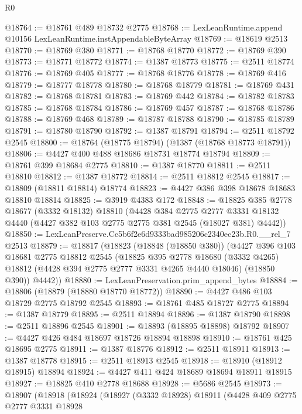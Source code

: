 \begin{lexlean}{R0}
\begin{coremodule}
@18764 := @18761 @489 @18732 @2775
@18768 := LexLeanRuntime.append @10156 LexLeanRuntime.instAppendableByteArray
@18769 := @18619 @2513
@18770 := @18769 @380
@18771 := @18768 @18770
@18772 := @18769 @390
@18773 := @18771 @18772
@18774 := @1387 @18773
@18775 := @2511 @18774
@18776 := @18769 @405
@18777 := @18768 @18776
@18778 := @18769 @416
@18779 := @18777 @18778
@18780 := @18768 @18779
@18781 := @18769 @431
@18782 := @18768 @18781
@18783 := @18769 @442
@18784 := @18782 @18783
@18785 := @18768 @18784
@18786 := @18769 @457
@18787 := @18768 @18786
@18788 := @18769 @468
@18789 := @18787 @18788
@18790 := @18785 @18789
@18791 := @18780 @18790
@18792 := @1387 @18791
@18794 := @2511 @18792 @2545
@18800 := @18764 (@18775 @18794) (@1387 (@18768 @18773 @18791))
@18806 := @4427 @400 @488 @18686 @18731 @18774 @18794
@18809 := @18761 @399 @18684 @2775
@18810 := @1387 @18770
@18811 := @2511 @18810
@18812 := @1387 @18772
@18814 := @2511 @18812 @2545
@18817 := @18809 (@18811 @18814) @18774
@18823 := @4427 @386 @398 @18678 @18683 @18810 @18814
@18825 := @3919 @4383 @172
@18848 := @18825
    @385
    @2778
    @18677
    (@3332 @18132)
    @18810
    (@4428
      @384
      @2775
      @2777
      @3331
      @18132
      @4440
      (@4427 @382 @103 @2775 @2775 @381 @2545 (@18027 @381) @4442))
@18850 := LexLeanPreserve.Cc5b6f2e6d9333bad985206c2340ec23b.R0.__rel_7 @2513
@18879 := @18817
    (@18823
      (@18848 (@18850 @380))
      (@4427
        @396
        @103
        @18681
        @2775
        @18812
        @2545
        (@18825
          @395
          @2778
          @18680
          (@3332 @4265)
          @18812
          (@4428 @394 @2775 @2777 @3331 @4265 @4440 @18046)
          (@18850 @390))
        @4442))
@18880 := LexLeanPreservation.prim_append_bytes
@18884 := @18806 (@18879 (@18880 @18770 @18772))
@18890 := @4427 @486 @103 @18729 @2775 @18792 @2545
@18893 := @18761 @485 @18727 @2775
@18894 := @1387 @18779
@18895 := @2511 @18894
@18896 := @1387 @18790
@18898 := @2511 @18896 @2545
@18901 := @18893 (@18895 @18898) @18792
@18907 := @4427 @426 @484 @18697 @18726 @18894 @18898
@18910 := @18761 @425 @18695 @2775
@18911 := @1387 @18776
@18912 := @2511 @18911
@18913 := @1387 @18778
@18915 := @2511 @18913 @2545
@18918 := @18910 (@18912 @18915) @18894
@18924 := @4427 @411 @424 @18689 @18694 @18911 @18915
@18927 := @18825 @410 @2778 @18688
@18928 := @5686 @2545
@18973 := @18907
    (@18918
      (@18924
        (@18927
          (@3332 @18928)
          @18911
          (@4428
            @409
            @2775
            @2777
            @3331
            @18928

\end{coremodule}
\end{lexlean}
